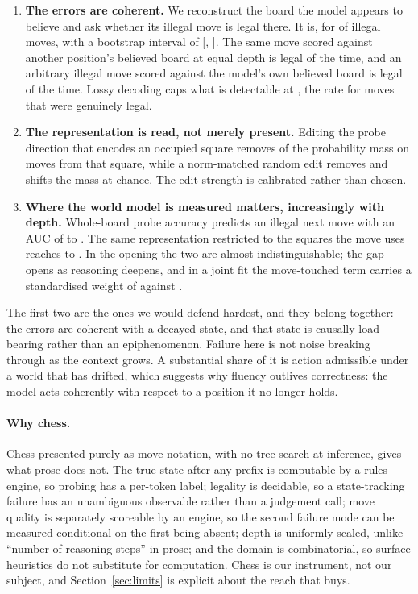 \documentclass[11pt]{article}
\theoremstyle{remark}
\begin{document}
\begin{enumerate}[nosep]
\item \textbf{The errors are coherent.} We reconstruct the board the model
appears to believe and ask whether its illegal move is legal there. It is, for
 of illegal moves, with a bootstrap interval of
[, ]. The same move scored against
another position's believed board at equal depth is legal  of
the time, and an arbitrary illegal move scored against the model's own believed
board is legal  of the time. Lossy decoding caps what is
detectable at , the rate for moves that were genuinely legal.
\item \textbf{The representation is read, not merely present.} Editing the probe
direction that encodes an occupied square removes  of the
probability mass on moves from that square, while a norm-matched random edit
removes  and shifts the mass at chance. The edit
strength is calibrated rather than chosen.
\item \textbf{Where the world model is measured matters, increasingly with
depth.} Whole-board probe accuracy predicts an illegal next move with an AUC of
 to . The same representation restricted to
the squares the move uses reaches  to . In
the opening the two are almost indistinguishable; the gap opens as reasoning
deepens, and in a joint fit the move-touched term carries a standardised
weight of  against .
\end{enumerate}

The first two are the ones we would defend hardest, and they belong together:
the errors are coherent with a decayed state, and that state is causally
load-bearing rather than an epiphenomenon. Failure here is not noise breaking
through as the context grows. A substantial share of it is action admissible under a
world that has drifted, which suggests why fluency outlives correctness: the
model acts coherently with respect to a position it no longer holds.

\paragraph{Why chess.}
Chess presented purely as move notation, with no tree search at inference, gives
what prose does not. The true state after any prefix is computable by a rules
engine, so probing has a per-token label; legality is decidable, so a
state-tracking failure has an unambiguous observable rather than a judgement
call; move quality is separately scoreable by an engine, so the second failure
mode can be measured conditional on the first being absent; depth is uniformly
scaled, unlike ``number of reasoning steps'' in prose; and the domain is
combinatorial, so surface heuristics do not substitute for computation. Chess is
our instrument, not our subject, and Section~\ref{sec:limits} is explicit about
the reach that buys.
\end{document}
